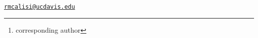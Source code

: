 \address{%
Andrew S. Lang\\
University of New Hampshire\\
\\
}


\address{%
Victoria S. Farrar\\
University of California, Davis\\
\\
}


\address{%
April Booth\\
University of California, Davis\\
\\
}


\address{%
Tanner Feustel\\
University of California, Davis\\
\\
}


\address{%
Matthew D. MacManes\\
University of New Hampshire\\
\\
}


\address{%
Rebecca M. Calisi \footnote{corresponding author}\\
University of California, Davis\\
\\
}
\href{mailto:rmcalisi@ucdavis.edu}{\nolinkurl{rmcalisi@ucdavis.edu}}


